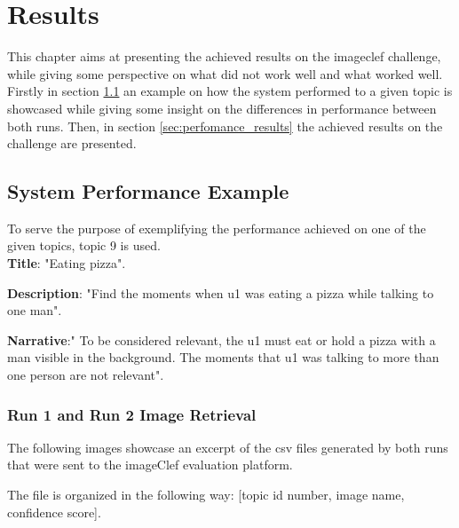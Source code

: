 \chapter{Results}

This chapter aims at presenting the achieved results on the imageclef challenge, while giving some perspective on what did not work well and what worked well. Firstly in section \ref{sec:example} an example on how the system performed to a given topic is showcased while giving some insight on the differences in performance between both runs. Then, in section \ref{sec:perfomance_results} the achieved results on the challenge are presented.

\newpage
\section{System Performance Example}
\label{sec:example}


To serve the purpose of exemplifying the performance achieved on one of the given topics, topic 9 is used.\\

\textbf{Title}: "Eating pizza".

\textbf{Description}: "Find the moments when u1 was eating a pizza
while talking to one man".

\textbf{Narrative}:" To be considered relevant, the u1 must eat or
hold a pizza with a man visible in the background. The moments that
u1 was talking to more than one person are not relevant".


\subsection{Run 1 and Run 2 Image Retrieval}

The following images showcase an excerpt of the csv files generated by both runs that were sent to the imageClef evaluation platform.

The file is organized in the following way: [topic id number, image name, confidence score].


